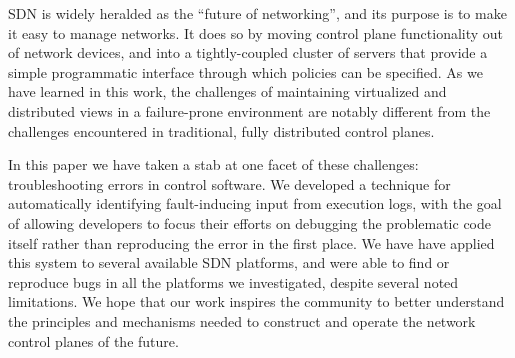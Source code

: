 SDN is widely heralded as the ``future of networking'', and its purpose is to make
it easy to manage networks. It does so by moving control plane functionality out of
network devices, and into a tightly-coupled cluster of servers that provide a simple
programmatic interface through which policies can be specified. As we have
learned in this work, the challenges of maintaining virtualized and distributed
views in a failure-prone environment are
notably different from the challenges encountered in traditional,
fully distributed control planes.

In this paper we have taken a stab at one facet of these challenges:
troubleshooting errors in control software. We developed a technique for automatically
identifying fault-inducing input from execution logs, with the
goal of allowing developers to focus their efforts on debugging the problematic
code itself rather than reproducing the error in the first place. We have
have applied this system to several available SDN platforms, and were able to find or reproduce bugs in all the platforms we investigated,
despite several noted limitations. We hope that our work inspires the community to
better understand the principles and mechanisms needed to construct and
operate the network control planes of the future.
